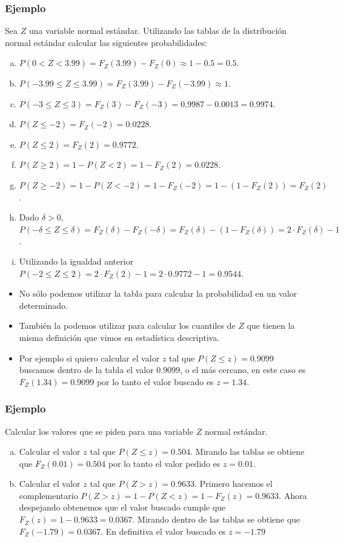 \begin{frame}

\frametitle{Ejemplo} 
Sea $Z$ una variable normal estándar. Utilizando las tablas de la distribución normal estándar calcular las siguientes probabilidades:
\begin{enumerate}[a)]
\item $P(0< Z < 3.99)=F_Z(3.99)-F_Z(0)\approx 1-0.5=0.5$. 
\item $P(-3.99\leq Z \leq 3.99)=F_{Z}(3.99)-F_{Z}(-3.99)\approx 1.$
\item $P(-3\leq Z \leq 3)=F_{Z}(3)-F_{Z}(-3)= 0.9987-0.0013=0.9974$.
\item $P(Z\leq -2)=F_Z(-2)=0.0228$.
\item $P( Z \leq 2)=F_{Z}(2)=0.9772$.
\item $P( Z \geq 2)=1-P(Z<2)=1-F_{Z}(2)=0.0228$.
\item $P( Z \geq -2)=1-P(Z< -2)=1-F_{Z}(-2)=1-(1-F_Z(2))=F_Z(2)$.
\item Dado $\delta>0$, $P(-\delta\leq Z \leq
\delta)=F_{Z}(\delta)-F_{Z}(-\delta)=F_Z(\delta)-(1-F_Z(\delta))=2\cdot  F_Z(\delta)-1$.
\item Utilizando la igualdad anterior
$P(-2\leq Z \leq 2)=2\cdot  F_Z(2)-1=2 \cdot 0.9772-1=0.9544$.
\end{enumerate}

\end{frame}


\begin{frame}

\begin{itemize}
\item No sólo podemos utilizar la tabla para calcular la probabilidad en un valor determinado. 
\item También la podemos utilizar para calcular los cuantiles de $Z$ que tienen la misma definición que vimos en estadística descriptiva.
\item  Por ejemplo si quiero calcular el valor $z$ tal que $P(Z\leq z)=0.9099$ buscamos dentro de la tabla el valor $0.9099$, o el más cercano, en este caso es $F_Z(1.34)=0.9099$ por lo tanto el valor buscado es $z=1.34$.
\end{itemize}
\end{frame}

\begin{frame}

\frametitle{Ejemplo}
 Calcular los valores que se piden para una variable $Z$ normal estándar.
\begin{enumerate}[a)]
\item Calcular el valor $z$ tal que $P(Z\leq z)=0.504$. Mirando las tablas se obtiene que  $F_Z(0.01)=0.504$ por lo tanto el valor pedido es $z=0.01$.
\item Calcular el valor $z$ tal que $P(Z> z)=0.9633$. Primero hacemos el complementario $P(Z>z)=1-P(Z<z)=1-F_Z(z)=0.9633$. Ahora despejando obtenemos que  el valor buscado cumple
que $F_Z(z)=1-0.9633= 0.0367$. Mirando dentro de las tablas se obtiene que $F_Z(-1.79)=0.0367$. En definitiva el valor buscado es $z=-1.79$
\end{enumerate}
\end{frame}



